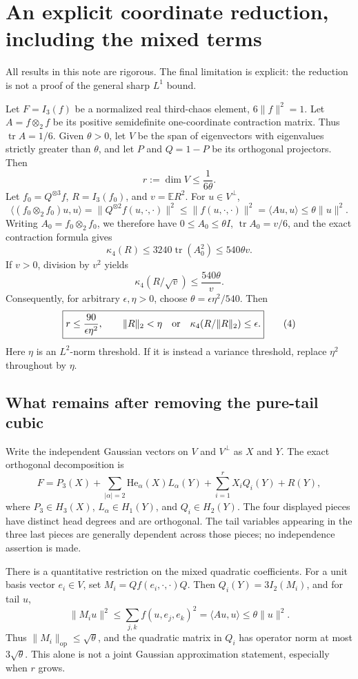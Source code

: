 \documentclass{article}
\begin{document}
\section*{An explicit coordinate reduction, including the mixed terms}
All results in this note are rigorous. The final limitation is explicit:
the reduction is not a proof of the general sharp $L^1$ bound.

Let $F=I_3(f)$ be a normalized real third-chaos element,
$6\|f\|^2=1$. Let $A=f\otimes_2f$ be its positive semidefinite
one-coordinate contraction matrix. Thus $\operatorname{tr}A=1/6$.
Given $\theta>0$, let $V$ be the span of eigenvectors with eigenvalues
strictly greater than $\theta$, and let $P$ and $Q=1-P$ be its orthogonal
projectors. Then
\[
 r:=\dim V\le\frac1{6\theta}.
 \tag{1}
\]
Let $f_0=Q^{\otimes3}f$, $R=I_3(f_0)$, and $v=\mathbb ER^2$.
For $u\in V^\perp$,
\[
 \langle (f_0\otimes_2 f_0)u,u\rangle
 =\|Q^{\otimes2}f(u,\cdot,\cdot)\|^2
 \le\|f(u,\cdot,\cdot)\|^2=\langle Au,u\rangle
 \le\theta\|u\|^2.
\]
Writing $A_0=f_0\otimes_2f_0$, we therefore have $0\le A_0\le\theta I$,
$\operatorname{tr}A_0=v/6$, and the exact contraction formula gives
\[
 \kappa_4(R)\le3240\operatorname{tr}(A_0^2)
 \le540\theta v.
 \tag{2}
\]
If $v>0$, division by $v^2$ yields
\[
 \kappa_4(R/\sqrt v)\le\frac{540\theta}{v}.
 \tag{3}
\]
Consequently, for arbitrary $\epsilon,\eta>0$, choose
$\theta=\epsilon\eta^2/540$. Then
\[
 \boxed{r\le\frac{90}{\epsilon\eta^2},\qquad
 \|R\|_2<\eta\quad\hbox{or}\quad
 \kappa_4(R/\|R\|_2)\le\epsilon.}
 \tag{4}
\]
Here $\eta$ is an $L^2$-norm threshold. If it is instead a variance
threshold, replace $\eta^2$ throughout by $\eta$.

\subsection*{What remains after removing the pure-tail cubic}
Write the independent Gaussian vectors on $V$ and $V^\perp$ as $X$ and $Y$.
The exact orthogonal decomposition is
\[
 F=P_3(X)+\sum_{|\alpha|=2}\mathrm{He}_\alpha(X)L_\alpha(Y)
      +\sum_{i=1}^r X_iQ_i(Y)+R(Y),
 \tag{5}
\]
where $P_3\in H_3(X)$, $L_\alpha\in H_1(Y)$, and $Q_i\in H_2(Y)$.
The four displayed pieces have distinct head degrees and are orthogonal.
The tail variables appearing in the three last pieces are generally
dependent across those pieces; no independence assertion is made.

There is a quantitative restriction on the mixed quadratic coefficients.
For a unit basis vector $e_i\in V$, set
$M_i=Qf(e_i,\cdot,\cdot)Q$. Then $Q_i(Y)=3I_2(M_i)$, and for tail $u$,
\[
 \|M_i u\|^2\le\sum_{j,k}f(u,e_j,e_k)^2
 =\langle Au,u\rangle\le\theta\|u\|^2.
\]
Thus $\|M_i\|_{\mathrm{op}}\le\sqrt\theta$, and the quadratic matrix
in $Q_i$ has operator norm at most $3\sqrt\theta$. This alone is not
a joint Gaussian approximation statement, especially when $r$ grows.
\end{document}
